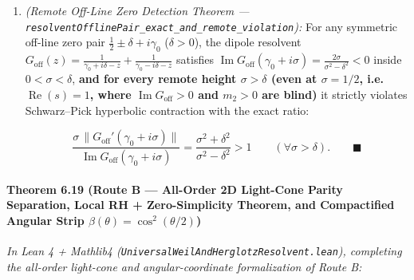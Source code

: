 \documentclass[
  11pt,
]{article}
\begin{document}
\begin{enumerate}
\begin{itemize}
    \[\frac{1}{\pi}\int_{-\infty}^\infty \operatorname{Im} G(\gamma + i\sigma)\,d\gamma = \sum_{m \in I} w_m \qquad (\forall \sigma > 0).\]
  \end{itemize}
\item
  \emph{(Remote Off-Line Zero Detection Theorem ---
  \texttt{resolventOfflinePair\_exact\_and\_remote\_violation}):} For
  any symmetric off-line zero pair
  \(\frac{1}{2} \pm \delta + i\gamma_0\) (\(\delta > 0\)), the dipole
  resolvent
  \(G_{\text{off}}(z) = \frac{1}{\gamma_0 + i\delta - z} + \frac{1}{\gamma_0 - i\delta - z}\)
  satisfies
  \(\operatorname{Im} G_{\text{off}}(\gamma_0 + i\sigma) = \frac{2\sigma}{\sigma^2 - \delta^2} < 0\)
  inside \(0 < \sigma < \delta\), \textbf{and for every remote height
  \(\sigma > \delta\) (even at \(\sigma = 1/2\),
  i.e.~\(\operatorname{Re}(s) = 1\), where
  \(\operatorname{Im} G_{\text{off}} > 0\) and \(m_2 > 0\) are blind)}
  it strictly violates Schwarz--Pick hyperbolic contraction with the
  exact ratio:

  \[\frac{\sigma\,\|G_{\text{off}}'(\gamma_0 + i\sigma)\|}{\operatorname{Im} G_{\text{off}}(\gamma_0 + i\sigma)} = \frac{\sigma^2 + \delta^2}{\sigma^2 - \delta^2} > 1 \qquad (\forall \sigma > \delta). \qquad \blacksquare\]
\end{enumerate}

\paragraph{\texorpdfstring{Theorem 6.19 (Route B --- All-Order 2D
Light-Cone Parity Separation, Local RH + Zero-Simplicity Theorem, and
Compactified Angular Strip
\(\beta(\theta) = \cos^2(\theta/2)\))}{Theorem 6.19 (Route B --- All-Order 2D Light-Cone Parity Separation, Local RH + Zero-Simplicity Theorem, and Compactified Angular Strip \textbackslash beta(\textbackslash theta) = \textbackslash cos\^{}2(\textbackslash theta/2))}}\label{theorem-6.19-route-b-all-order-2d-light-cone-parity-separation-local-rh-zero-simplicity-theorem-and-compactified-angular-strip-betatheta-cos2theta2}

\emph{In Lean 4 + Mathlib4
(\texttt{UniversalWeilAndHerglotzResolvent.lean}), completing the
all-order light-cone and angular-coordinate formalization of Route B:}
\end{document}
